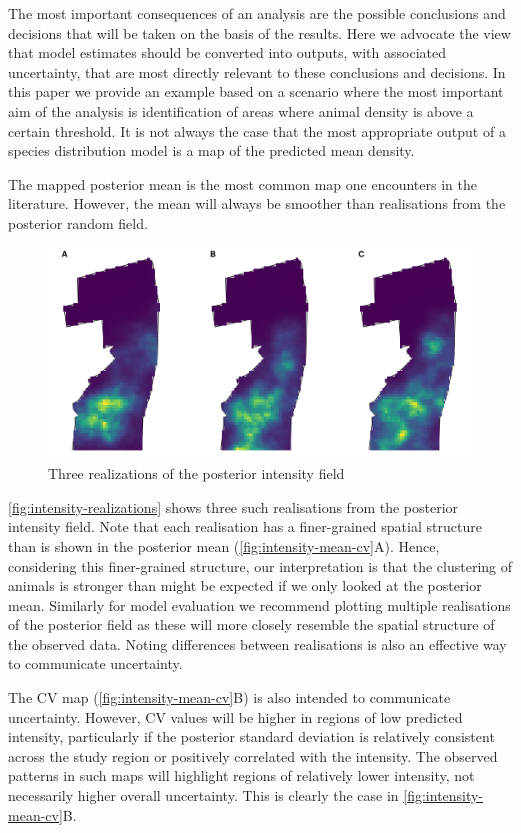 \documentclass{stylefile16/statsoc}
\begin{document}
The most important consequences of an analysis are the possible conclusions and decisions that will be taken on the basis of the results.  Here we advocate the view that model estimates should be converted into outputs, with associated uncertainty, that are most directly relevant to these conclusions and decisions.  In this paper we provide an example based on a scenario where the most important aim of the analysis is identification of areas where animal density is above a certain threshold.  It is not always the case that the most appropriate output of a species distribution model is a map of the predicted mean density.

The mapped posterior mean is the most common map one encounters in the literature.  However, the mean will always be smoother than realisations from the posterior random field.
\begin{figure}[!htb]
	\includegraphics[scale=0.525]{figures/intensity_realized.png}
	\caption{Three realizations of the posterior intensity field}
	\label{fig:intensity-realizations}
\end{figure}
\autoref{fig:intensity-realizations} shows three such realisations from the posterior intensity field.  Note that each realisation has a finer-grained spatial structure than is shown in the posterior mean (\autoref{fig:intensity-mean-cv}A).  Hence, considering this finer-grained structure, our interpretation is that the clustering of animals is stronger than might be expected if we only looked at the posterior mean.  Similarly for model evaluation we recommend plotting multiple realisations of the posterior field as these will more closely resemble the spatial structure of the observed data.  Noting differences between realisations is also an effective way to communicate uncertainty.

The CV map (\autoref{fig:intensity-mean-cv}B) is also intended to communicate uncertainty.  However, CV values will be higher in regions of low predicted intensity, particularly if the posterior standard deviation is relatively consistent across the study region or positively correlated with the intensity.  The observed patterns in such maps will highlight regions of relatively lower intensity, not necessarily higher overall uncertainty.  This is clearly the case in \autoref{fig:intensity-mean-cv}B.
\end{document}
